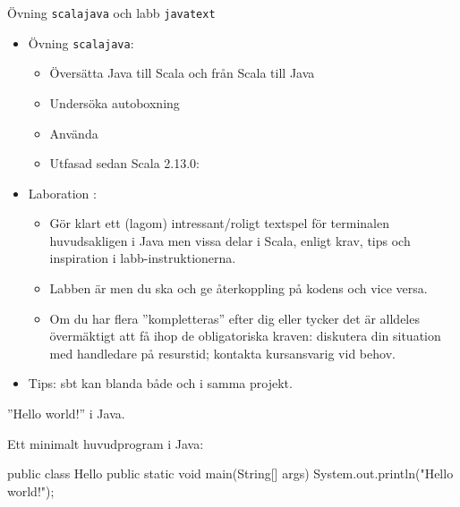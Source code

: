 



\begin{Slide}{Övning \texttt{scalajava} och labb \texttt{javatext}}\SlideFontSmall
\begin{itemize}
\item Övning \texttt{scalajava}:
\begin{itemize}\SlideFontTiny
\item Översätta Java till Scala och från Scala till Java
\item Undersöka autoboxning 
\item Använda 
\item[] Utfasad  sedan Scala 2.13.0: 
\end{itemize}
\item Laboration :
\begin{itemize}\SlideFontTiny
  \item Gör klart ett (lagom) intressant/roligt textspel för terminalen huvudsakligen i Java men vissa delar i Scala, enligt krav, tips och inspiration i labb-instruktionerna.
  \item Labben är  men du ska  och ge återkoppling på kodens  och vice versa.
  \item Om du har flera ''kompletteras'' efter dig eller tycker det är alldeles övermäktigt att få ihop de obligatoriska kraven: diskutera din situation med handledare på resurstid; kontakta kursansvarig vid behov. 
\end{itemize}
\item Tips: sbt kan blanda både  och  i samma projekt.
\end{itemize}
\end{Slide}


\begin{Slide}{''Hello world!'' i Java.}

\noindent Ett minimalt huvudprogram i Java:
\begin{Code}[language=Java]
public class Hello {
    public static void main(String[] args) {
        System.out.println("Hello world!");
    }
}
\end{Code}


\end{Slide}

